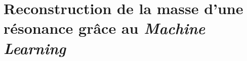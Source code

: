 \chapter{Reconstruction de la masse d'une résonance grâce au \emph{Machine Learning}}\label{chapter-ML}








